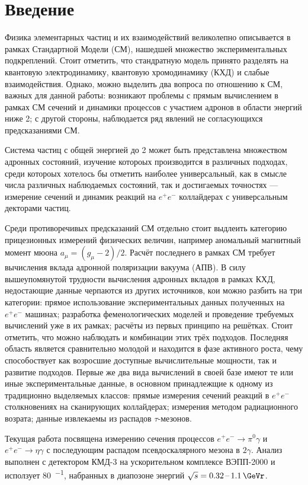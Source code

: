 \section{Введение}


Физика элементарных частиц и их взаимодействий великолепно описывается в рамках Стандартной Модели (СМ),
нашедшей множество экспериментальных подкреплений.
Стоит отметить,
что стандратную модель принято разделять на квантовую электродинамику,
квантовую хромодинамику (КХД)
и слабые взаимодействия.
Однако,
можно выделить два вопроса по отношению к СМ,
важных для данной работы:
возникают проблемы с прямым вычислением в рамках СМ сечений и динамики процессов с участием адронов в области энергий ниже \SI{2}{\GeVr};
с другой стороны,
наблюдается ряд явлений не согласующихся предсказаниями СМ.

Система частиц с общей энергией до \SI{2}{\GeVr} может быть представлена множеством адронных состояний,
изучение котороых производится в различных подходах,
среди котороых хотелось бы отметить наиболее универсальный, 
как в смысле числа различных наблюдаемых состояний,
так и достигаемых точностях
---
измерение сечений и динамик реакций на $e^+ e^-$ коллайдерах с универсальным декторами частиц.

Среди противоречивых предсказаний СМ
отдельно стоит выдлеить категорию прицезионных измерений физических величин,
например аномальный магнитный момент мюона $a_\mu = (g_\mu - 2)/2$.
Расчёт последнего в рамках СМ требует вычисления вклада адронной поляризации вакуума (АПВ).
В силу вышеупомянутой трудности вычисления адронных вкладов в рамках КХД,
недостающие данные черпаются из других источников,
кои можно разбить на три категории:
прямое использование экспериментальных данных полученных на $e^+ e^-$ машинах;
разработка феменологических моделей и проведение требуемых вычислений уже в их рамках;
расчёты из первых принципо на решётках.
Стоит отметить,
что можно наблюдать и комбинации этих трёх подходов.
Последняя область является сравнительно молодой и находится в фазе активного роста,
чему способоствует как возросшие доступные вычислительные мощности,
так и развитие подходов.
Первые же два вида вычислений в своей базе имеют те или иные экспериментальные данные,
в основном принадлежщие к одному из традиционно выделяемых классов:
прямые измерения сечений реакций в $e^+ e^-$ столкновениях на сканирующих коллайдерах;
измерения методом радиационного возрата;
данные извлекаемы из распадов $\tau$-мезонов.


Текущая работа посвящена измерению сечения процессов
$e^+e^- \to \pi^0 \gamma$ и 
$e^+e^- \to \eta \gamma$ с последующим распадом псевдоскалярного мезона в $2\gamma$.
Анализ выполнен с детектором КМД-3 на ускорительном комплексе ВЭПП-2000
и исползует \SI{80}{\pbarnr^{-1}},
набранных в диапозоне энергий $\sqrt{s} = \SIrange{0.32}{1.1}{\GeVr}$.



